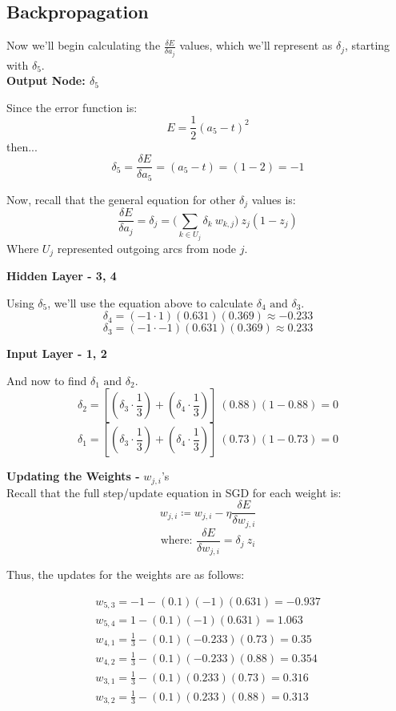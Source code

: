 \documentclass[11pt]{article}
\begin{document}
\subsection{Backpropagation}
Now we'll begin calculating the $\frac{\delta E}{\delta a_j}$ values, which we'll represent as $\delta_j$, starting with $\delta_5$.\\

\textbf{Output Node: $\delta_5$}
\begin{center}
Since the error function is:
\[E = \frac{1}{2}(a_5 - t)^2\]
then...
\[\delta_5 = \frac{\delta E}{\delta a_5} = (a_5 -t) = (1-2) = -1\]
\end{center}

\begin{center}
Now, recall that the general equation for other $\delta_j$ values is:
\[\frac{\delta E}{\delta a_j} = \delta_j = \bigg( \sum_{k\in U_j} \delta_k \ w_{k, j}\bigg) \ z_j(1-z_j)\]
\indent Where $U_j$ represented outgoing arcs from node $j$.\\
\end{center}
\textbf{Hidden Layer - 3, 4}
\begin{center}
Using $\delta_5$, we'll use the equation above to calculate $\delta_4 \text{ and } \delta_3$.
\[ \delta_4 = (-1  \cdot 1)(0.631)(0.369) \approx -0.233 \]
\[ \delta_3 = (-1  \cdot -1)(0.631)(0.369) \approx 0.233 \]
\end{center}

\textbf{Input Layer - 1, 2}
\begin{center}
And now to find $\delta_1 \text{ and } \delta_2.$
\[ \delta_2 = [(\delta_3 \cdot \frac{1}{3}) + (\delta_4 \cdot \frac{1}{3})] \ (0.88)(1-0.88) = 0 \]
\[ \delta_1 = [(\delta_3 \cdot \frac{1}{3}) + (\delta_4 \cdot \frac{1}{3})] \ (0.73)(1-0.73) = 0 \]
\end{center}


\textbf{Updating the Weights - }$w_{j,i}$'s\\

Recall that the full step/update equation in SGD for each weight is:
\[ w_{j,i} \coloneqq w_{j,i}  -  \eta \frac{\delta E}{\delta w_{j,i}} \]
\[\text{where: } \frac{\delta E}{\delta w_{j,i}} = \delta_j \ z_i \]
\pagebreak

Thus, the updates for the weights are as follows:
\begin{center}
\begin{gather*}
w_{5, 3} = -1 - (0.1)(-1)(0.631) = -0.937\\
w_{5, 4} = 1 - (0.1)(-1)(0.631) = 1.063\\
w_{4, 1} = \frac{1}{3} - (0.1)(-0.233)(0.73) = 0.35\\
w_{4, 2} = \frac{1}{3} - (0.1)(-0.233)(0.88) = 0.354\\
w_{3, 1} = \frac{1}{3} - (0.1)(0.233)(0.73) = 0.316\\
w_{3, 2} = \frac{1}{3} - (0.1)(0.233)(0.88) = 0.313
\end{gather*}
\end{center}
\end{document}
